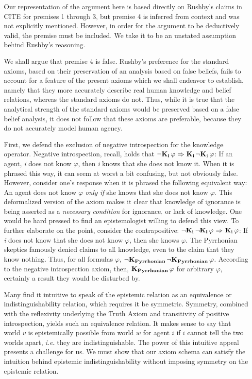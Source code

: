Our representation of the argument here is based directly on Rushby's claims in CITE for premises 1 through 3, but premise 4 is inferred from context and was not explicitly mentioned. However, in order for the argument to be deductively valid, the premise must be included. We take it to be an unstated assumption behind Rushby's reasoning.

We shall argue that premise 4 is false. Rushby's preference for the standard axioms, based on their preservation of an analysis based on false beliefs, fails to account for a feature of the present axioms which we shall endeavor to establish, namely that they more accurately describe real human knowledge and belief relations, whereas the standard axioms do not. Thus, while it is true that the analytical strength of the standard axioms would be preserved based on a false belief analysis, it does not follow that these axioms are preferable, because they do not accurately model human agency.

First, we defend the exclusion of negative introspection for the knowledge operator. Negative introspection, recall, holds that ${\neg}\mathbf{K}_{\mathbf{i}}\,\varphi{\ \Rightarrow \ }\mathbf{K}_{\mathbf{i}}\,{\neg}\mathbf{K}_{\mathbf{i}}\,\varphi$: If an agent, \emph{i} does not know $\varphi$, then \emph{i} knows that she does not know it. When it is phrased this way, it can seem at worst a bit confusing, but not obviously false. However, consider one's response when it is phrased the following equivalent way: An agent does not know $\varphi$ \emph{only if} she knows that she does not know $\varphi$. This deformalized version of the axiom makes it clear that knowledge of ignorance is being asserted as a \emph{necessary condition} for ignorance, or lack of knowledge. One would be hard pressed to find an epistemologist willing to defend this view. To further elaborate on the point, consider the contrapositive: ${\neg}\mathbf{K}_{\mathbf{i}}\,{\neg}\mathbf{K}_{\mathbf{i}}\,\varphi {\ \Rightarrow \ } \mathbf{K}_{\mathbf{i}}\,\varphi$: If \emph{i} does not know that she does not know $\varphi$, then she knows $\varphi$. The Pyrrhonian skeptics famously denied claims to all knowledge, even to the claim that they know nothing. Thus, for all formulas $\varphi$, ${\neg}\mathbf{K}_{\mathbf{Pyrrhonian}}\,{\neg}\mathbf{K}_{\mathbf{Pyrrhonian}}\,\varphi$. According to the negative introspection axiom, then, $\mathbf{K}_{\mathbf{Pyrrhonian}}\,\varphi$ for arbitrary $\varphi$, certainly a result they would be disturbed by.

Many find it intuitive to speak of the epistemic relation as an equivalence or indistinguishability relation, which requires it be symmetric. Symmetry, combined with the reflexivity underlying the Truth Axiom and transitivity of positive introspection, yields such an equivalence relation. It makes sense to say that world $v$ is epistemically possible from world $w$ for agent $i$ if $i$ cannot tell the two worlds apart, \emph{i.e.} they are indistinguishable. The power of this intuitive appeal presents a challenge for us. We must show that our axiom schema can satisfy the intuition behind epistemic indistinguishability without imposing symmetry on the epistemic relation.

